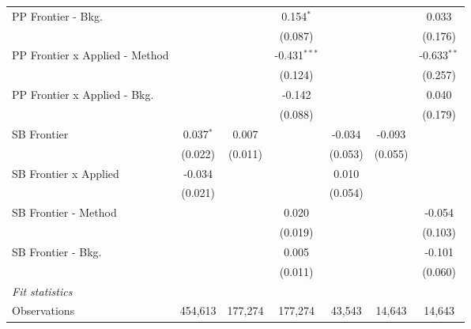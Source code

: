 \begin{tabular}{lcccccc}
   PP Frontier - Bkg.             &                &                & 0.154$^{*}$    &                &              & 0.033\\   
                                  &                &                & (0.087)        &                &              & (0.176)\\   
   PP Frontier x Applied - Method &                &                & -0.431$^{***}$ &                &              & -0.633$^{**}$\\   
                                  &                &                & (0.124)        &                &              & (0.257)\\   
   PP Frontier x Applied - Bkg.   &                &                & -0.142         &                &              & 0.040\\   
                                  &                &                & (0.088)        &                &              & (0.179)\\   
   SB Frontier                    & 0.037$^{*}$    & 0.007          &                & -0.034         & -0.093       &   \\   
                                  & (0.022)        & (0.011)        &                & (0.053)        & (0.055)      &   \\   
   SB Frontier x Applied          & -0.034         &                &                & 0.010          &              &   \\   
                                  & (0.021)        &                &                & (0.054)        &              &   \\   
   SB Frontier - Method           &                &                & 0.020          &                &              & -0.054\\   
                                  &                &                & (0.019)        &                &              & (0.103)\\   
   SB Frontier - Bkg.             &                &                & 0.005          &                &              & -0.101\\   
                                  &                &                & (0.011)        &                &              & (0.060)\\   
   \midrule
   \emph{Fit statistics}\\
   Observations                   & 454,613        & 177,274        & 177,274        & 43,543         & 14,643       & 14,643\\  

\end{tabular}
